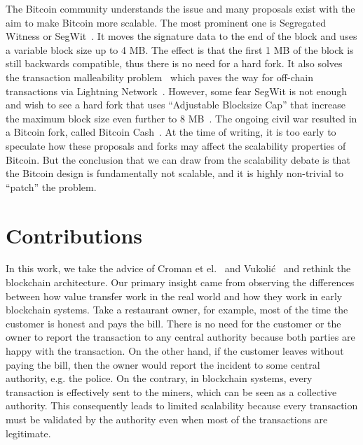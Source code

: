 The Bitcoin community understands the issue and many proposals exist with the aim to make Bitcoin more scalable.
The most prominent one is Segregated Witness or SegWit~\cite{segwit}.
It moves the signature data to the end of the block and uses a variable block size up to 4 MB.
The effect is that the first 1 MB of the block is still backwards compatible, thus there is no need for a hard fork.
It also solves the transaction malleability problem~\cite{bitcoinmalleability} which paves the way for off-chain transactions via Lightning Network~\cite{lightningnetwork}.
However, some fear SegWit is not enough and wish to see a hard fork that uses ``Adjustable Blocksize Cap'' that increase the maximum block size even further to 8 MB~\cite{bitcoincash}.
The ongoing civil war resulted in a Bitcoin fork, called Bitcoin Cash~\cite{bitcoincasharticle}.
At the time of writing, it is too early to speculate how these proposals and forks may affect the scalability properties of Bitcoin.
But the conclusion that we can draw from the scalability debate is that the Bitcoin design is fundamentally not scalable,
and it is highly non-trivial to ``patch'' the problem.

\section{Contributions}
In this work, we take the advice of Croman et el.~\cite{croman2016scaling} and Vukoli\'{c}~\cite{vukolic2015quest} and rethink the blockchain architecture.
Our primary insight came from observing the differences between how value transfer work in the real world and how they work in early blockchain systems.
Take a restaurant owner, for example,
most of the time the customer is honest and pays the bill.
There is no need for the customer or the owner to report the transaction to any central authority 
because both parties are happy with the transaction.
On the other hand, if the customer leaves without paying the bill,
then the owner would report the incident to some central authority, e.g. the police.
On the contrary, in blockchain systems, every transaction is effectively sent to the miners,
which can be seen as a collective authority.
This consequently leads to limited scalability because every transaction must be validated by the authority even when most of the transactions are legitimate.

